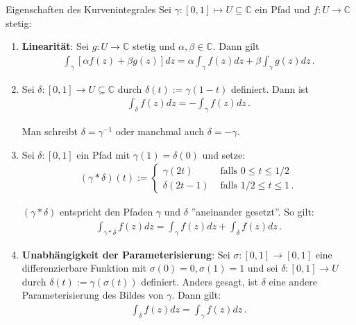 \documentclass[a4paper,10pt]{article}
\def\C{\mathbb{C}}
\begin{document}
\begin{subbox}{Eigenschaften des Kurvenintegrales}
   Sei $\gamma: [0, 1] \mapsto U \subseteq \C$ ein Pfad und \(f\colon U\to\mathbb{C}\) stetig:

  \begin{enumerate}
    \item{
      \textbf{Linearität}: Sei \(g\colon U\to\mathbb{C}\) stetig und \(\alpha,\beta \in \mathbb{C}\). Dann gilt \begin{align*} \int_{\gamma} [ \alpha f(z) + \beta g(z) ] dz = \alpha \int_{\gamma} f(z)dz + \beta \int_{\gamma} g(z)dz\,. \end{align*}
    }
    \item{
      Sei \(\delta\colon[0,1]\to U\subseteq\mathbb{C}\) durch \(\delta(t):=\gamma(1-t)\) definiert. Dann ist \begin{align*} \int_{\delta} f(z) dz =-\int_{\gamma} f(z) dz\,. \end{align*}
 
      Man schreibt \(\delta=\gamma^{-1}\) oder manchmal auch \(\delta=-\gamma\).
    }
    \item{
      Sei \(\delta\colon[0,1]\) ein Pfad mit \(\gamma (1) = \delta(0)\) und setze:
      \begin{align*} (\gamma * \delta) (t) := \begin{cases} \gamma(2t) &\text{ falls } 0 \leq t \leq 1/2\\ \delta (2t-1) &\text{ falls } 1/2 \leq t \leq 1\,. \end{cases} \end{align*}

      $(\gamma * \delta)$ entspricht den Pfaden $\gamma$ und $\delta$ ''aneinander gesetzt''. So gilt:
      \begin{align*} \int_{\gamma * \delta} f(z) dz = \int_{\gamma} f(z) dz + \int_{\delta} f(z) dz\,. \end{align*}
    }
    \item{
      \textbf{Unabhängigkeit der Parameterisierung}: Sei \(\sigma \colon [0,1] \to [0,1]\) eine differenzierbare Funktion mit \(\sigma(0) =0, \sigma(1)=1\) und sei \(\delta\colon[0,1]\to U\) durch \(\delta (t) := \gamma (\sigma (t))\) definiert. Anders gesagt, ist \(\delta\) eine andere Parameterisierung des Bildes von \(\gamma\). Dann gilt:
      \begin{align*} \int_{\delta} f(z)dz=\int_{\gamma} f(z) dz\,. \end{align*}
    }
  \end{enumerate}
\end{subbox}
\end{document}
